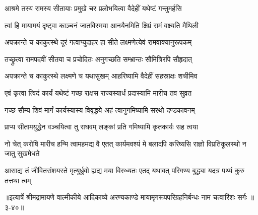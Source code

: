 \twolineshloka
{आश्रमे तस्य रामस्य सीतायाः प्रमुखे चर}
{प्रलोभयित्वा वैदेहीं यथेष्टं गन्तुमर्हसि} %

\twolineshloka
{त्वां हि मायामयं दृष्ट्वा काञ्चनं जातविस्मया}
{आनयैनमिति क्षिप्रं रामं वक्ष्यति मैथिली} %

\twolineshloka
{अपक्रान्ते च काकुत्स्थे दूरं गत्वाप्युदाहर}
{हा सीते लक्ष्मणेत्येवं रामवाक्यानुरूपकम्} %

\twolineshloka
{तच्छ्रुत्वा रामपदवीं सीतया च प्रचोदितः}
{अनुगच्छति सम्भ्रान्तः सौमित्रिरपि सौहृदात्} %

\twolineshloka
{अपक्रान्ते च काकुत्स्थे लक्ष्मणे च यथासुखम्}
{आहरिष्यामि वैदेहीं सहस्राक्षः शचीमिव} %

\twolineshloka
{एवं कृत्वा त्विदं कार्यं यथेष्टं गच्छ राक्षस}
{राज्यस्यार्धं प्रदास्यामि मारीच तव सुव्रत} %

\twolineshloka
{गच्छ सौम्य शिवं मार्गं कार्यस्यास्य विवृद्धये}
{अहं त्वानुगमिष्यामि सरथो दण्डकावनम्} %

\twolineshloka
{प्राप्य सीतामयुद्धेन वञ्चयित्वा तु राघवम्}
{लङ्कां प्रति गमिष्यामि कृतकार्यः सह त्वया} %

\threelineshloka
{नो चेत् करोषि मारीच हन्मि त्वामहमद्य वै}
{एतत् कार्यमवश्यं मे बलादपि करिष्यसि}
{राज्ञो विप्रतिकूलस्थो न जातु सुखमेधते} %

\twolineshloka
{आसाद्य तं जीवितसंशयस्ते मृत्युर्ध्रुवो ह्यद्य मया विरुध्यतः}
{एतद् यथावत् परिगण्य बुद्ध्या यदत्र पथ्यं कुरु तत्तथा त्वम्} %


॥इत्यार्षे श्रीमद्रामायणे वाल्मीकीये आदिकाव्ये अरण्यकाण्डे मायामृगरूपपरिग्रहनिर्बन्धः नाम चत्वारिंशः सर्गः ॥३-४०॥
